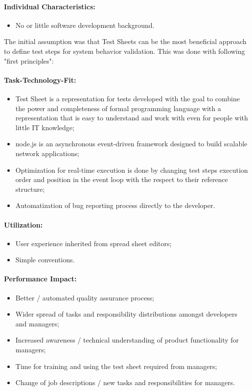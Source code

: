 \paragraph{Individual Characteristics:}
\begin{itemize}
	\item  No or little software development background.
\end{itemize}


The initial assumption was that Test Sheets can be the most beneficial approach to define test steps for system behavior validation. This was done with following "first principles":
\paragraph{Task-Technology-Fit:}
\begin{itemize}
	\item Test Sheet is a representation for tests developed with the goal to combine the power and completeness of formal programming language with a representation that is easy to understand and work with even for people with little IT knowledge\cite{ts};
	\item node.js is an asynchronous event-driven framework designed to build scalable network applications;
	\item Optimization for real-time execution is done by changing test steps execution order and position in the event loop with the respect to their reference structure;
	\item Automatization of bug reporting process directly to the developer.
\end{itemize}

\paragraph{Utilization:}
\begin{itemize}
	\item User experience inherited from spread sheet editors;
	\item Simple conventions.
\end{itemize}

\paragraph{Performance Impact:}
\begin{itemize}
	\item Better / automated quality assurance process;
	\item Wider spread of tasks and responsibility distributions amongst developers and managers;
	\item Increased awareness / technical understanding of product functionality for managers;
	\item Time for training and using the test sheet required from managers;
	\item Change of job descriptions / new tasks and responsibilities for managers.
\end{itemize}

